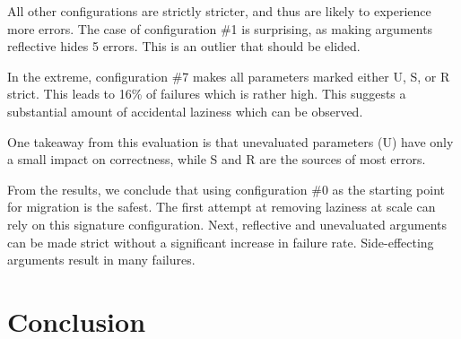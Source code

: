 \documentclass[review,nonacm,screen,acmsmall,anonymous=true]{acmart}
\newcommand{\config}[1]{configuration \#{#1}}
\begin{document}
All other configurations are strictly stricter, and thus are likely to experience
more errors. The case of \config 1 is surprising, as making arguments reflective
hides 5 errors. This is an outlier that should be elided.

In the extreme, \config 7 makes all parameters marked either U, S, or R strict.
This leads to 16\% of failures which is rather high. This suggests a substantial
amount of accidental laziness which can be observed.

One takeaway from this evaluation is that unevaluated parameters (U) have only a
small impact on correctness, while S and R are the sources of most errors.

From the results, we conclude that using \config 0 as the starting point for 
migration is the safest. The first attempt at removing laziness at scale can rely on
this signature configuration. Next, reflective and unevaluated arguments can be
made strict without a significant increase in failure rate. Side-effecting
arguments result in many failures.

\section{Conclusion}\label{sec:conclusion}
\end{document}
